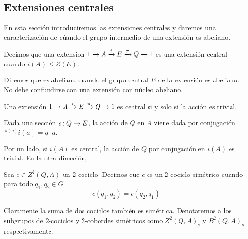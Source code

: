 
\subsection{Extensiones centrales}

En esta sección introduciremos las extensiones centrales y daremos una caracterización de cúando el grupo intermedio de una extensión es abeliano.

\begin{definicion}
	Decimos que una extension $\extension i \pi A E Q$ es una extensión central cuando $i(A)\leq Z(E)$. 
	
	Diremos que es abeliana cuando el grupo central $E$ de la extensión es abeliano. No debe confundirse con una extensión con núcleo abeliano.
\end{definicion}

\begin{proposicion}
	Una extensión $\extension i \pi A E Q$ es central si y solo si la acción es trivial.
	\begin{demostracion}
		Dada una sección $\homo s Q E$, la acción de $Q$ en $A$ viene dada por conjugación $\,^{s(q)}i(a)=q\cdot a$.
		
		
		Por un lado, si $i(A)$ es central, la acción de $Q$ por conjugación en $i(A)$ es trivial. En la otra dirección, 
	\end{demostracion}
\end{proposicion}

\begin{definicion}
	Sea $c\in Z^2(Q,A)$ un $2$-cociclo. Decimos que $c$ es un $2$-cociclo simétrico cuando para todo $q_1,q_2\in G$
	\begin{equation*}
		c(q_1,q_2)=c(q_2,q_1)
	\end{equation*}
	
	Claramente la suma de dos cociclos también es simétrica. Denotaremos a los subgrupos de $2$-cociclos y $2$-cobordes simétricos como $Z^2(Q,A)_s$ y $B^2(Q,A)_s$ respectivamente.
\end{definicion}


